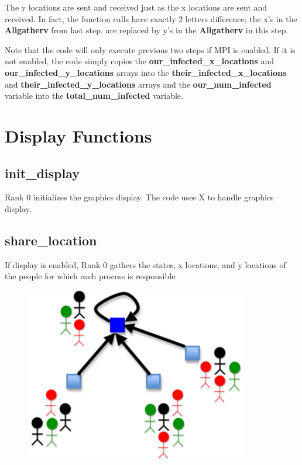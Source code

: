 \documentclass[letterpaper,10pt,openany,oneside]{sphinxmanual}
\begin{document}
The y locations are sent and received just as the x locations are sent and received. In fact, the function calls have exactly 2 letters difference; the x’s in the \textbf{Allgatherv} from last step. are replaced by y’s in the \textbf{Allgatherv} in this step.

Note that the code will only execute previous two steps if MPI is enabled. If it is not enabled, the code simply copies the \textbf{our\_infected\_x\_locations} and \textbf{our\_infected\_y\_locations} arrays into the \textbf{their\_infected\_x\_locations} and \textbf{their\_infected\_y\_locations} arrays and the \textbf{our\_num\_infected} variable into the \textbf{total\_num\_infected} variable.


\chapter{Display Functions}
\label{5-Display/display::doc}\label{5-Display/display:display-functions}

\section{init\_display}
\label{5-Display/display:init-display}
Rank 0 initializes the graphics display. The code uses X to handle graphics display.


\section{share\_location}
\label{5-Display/display:share-location}
If display is enabled, Rank 0 gathers the states, x locations, and y locations of the people for which each process is responsible
\begin{figure}[htbp]
\centering

\includegraphics{img-18.png}
\end{figure}
\end{document}

